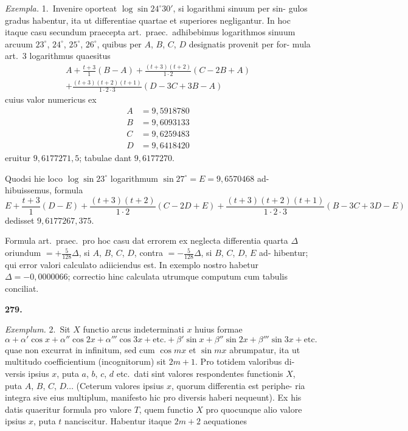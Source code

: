 \documentclass[12pt,a4paper]{article}
\begin{document}
\smallskip\noindent
\textit{Exempla.} 1.\ Invenire oporteat $\log\sin 24^{\circ}30'$, si logarithmi sinuum per sin-
gulos gradus habentur, ita ut differentiae quartae et superiores negligantur. In
hoc itaque casu secundum praecepta art.\ praec.\ adhibebimus logarithmos sinuum
arcuum $23^{\circ}$, $24^{\circ}$, $25^{\circ}$, $26^{\circ}$, quibus per $A$, $B$, $C$, $D$ designatis provenit per for-
mula art.\ 3 logarithmus quaesitus
\begin{multline*}
A + \frac{t+3}{1}(B-A) + \frac{(t+3)(t+2)}{1\cdot 2}(C-2B+A)\\
+ \frac{(t+3)(t+2)(t+1)}{1\cdot 2\cdot 3}(D-3C+3B-A)
\end{multline*}
cuius valor numericus ex
\begin{align*}
A &= 9{,}5918780 \\
B &= 9{,}6093133 \\
C &= 9{,}6259483 \\
D &= 9{,}6418420
\end{align*}
eruitur $9{,}6177271{,}5$; tabulae dant $9{,}6177270$.

\smallskip\noindent
Quodsi hie loco $\log\sin 23^{\circ}$ logarithmum $\sin 27^{\circ} = E = 9{,}6570468$ ad-
hibuissemus, formula
\begin{equation*}
E + \frac{t+3}{1}(D-E) + \frac{(t+3)(t+2)}{1\cdot 2}(C-2D+E)
+ \frac{(t+3)(t+2)(t+1)}{1\cdot 2\cdot 3}(B-3C+3D-E)
\end{equation*}
dedisset $9{,}6177267{,}375$.

\smallskip\noindent
Formula art.\ praec.\ pro hoc casu dat errorem ex neglecta differentia quarta
$\Delta$ oriundum $= +\frac{5}{128}\Delta$, si $A$, $B$, $C$, $D$, contra $=-\frac{5}{128}\Delta$, si $B$, $C$, $D$, $E$ ad-
hibentur; qui error valori calculato adiiciendus est. In exemplo nostro habetur
$\Delta = -0{,}0000066$; correctio hinc calculata utrumque computum cum tabulis
conciliat.

\newpage
\noindent\textbf{279.}

\smallskip\noindent
\textit{Exemplum.} 2.\ Sit $X$ functio arcus indeterminati $x$ huius formae
\begin{equation*}
\alpha + \alpha'\cos x + \alpha''\cos 2x + \alpha'''\cos 3x + \text{etc.}
+ \beta'\sin x + \beta''\sin 2x + \beta'''\sin 3x + \text{etc.}
\end{equation*}
quae non excurrat in infinitum, sed cum $\cos mx$ et $\sin mx$ abrumpatur, ita
ut multitudo coefficientium (incognitorum) sit $2m+1$. Pro totidem valoribus di-
versis ipsius $x$, puta $a$, $b$, $c$, $d$ etc.\ dati sint valores respondentes functionis $X$,
puta $A$, $B$, $C$, $D\dots$ (Ceterum valores ipsius $x$, quorum differentia est periphe-
ria integra sive eius multiplum, manifesto hic pro diversis haberi nequeunt). Ex
his datis quaeritur formula pro valore $T$, quem functio $X$ pro quocunque alio
valore ipsius $x$, puta $t$ nanciscitur. Habentur itaque $2m+2$ aequationes
\end{document}
